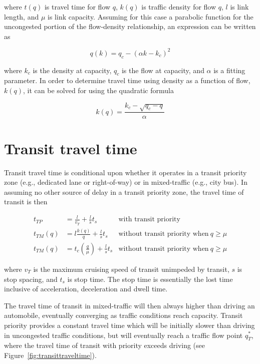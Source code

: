 \documentclass{article}
\begin{document}
\noindent where $t(q)$ is travel time for flow $q$, $k(q)$ is traffic density for flow $q$, $l$ is link length, and $\mu$ is link capacity. Assuming for this case a parabolic function for the uncongested portion of the flow-density relationship, an expression can be written as

\begin{equation}
    q(k) = q_c - (\alpha k - k_c)^2
\end{equation}

\noindent where $k_c$ is the density at capacity, $q_c$ is the flow at capacity, and $\alpha$ is a fitting parameter. In order to determine travel time using density as a function of flow, $k(q)$, it can be solved for using the quadratic formula

\begin{equation}
    k(q) = \frac{k_c - \sqrt{q_c - q}}{\alpha}
\end{equation}


\section{Transit travel time}

Transit travel time is conditional upon whether it operates in a transit priority zone (e.g., dedicated lane or right-of-way) or in mixed-traffic (e.g., city bus). In assuming no other source of delay in a transit priority zone, the travel time of transit is then

\begin{subequations}
\begin{align}
    t_{TP} & = \frac{l}{v_T} + \frac{l}{s}t_s  & \text{with transit priority} \\
    t_{TM}(q) & = l\frac{k(q)}{q} + \frac{l}{s}t_s  & \text{without transit priority when}~q \geq \mu\\
    t_{TM}(q) & = t_c \left(\frac{q}{\mu}\right) + \frac{l}{s}t_s & \text{without transit priority when}~q \geq \mu
\end{align}
\end{subequations}

\noindent where $v_T$ is the maximum cruising speed of transit unimpeded by transit, $s$ is stop spacing, and $t_s$ is stop time. The stop time is essentially the lost time inclusive of acceleration, deceleration and dwell time.

The travel time of transit in mixed-traffic will then always higher than driving an automobile, eventually converging as traffic conditions reach capacity. Transit priority provides a constant travel time which will be initially slower than driving in uncongested traffic conditions, but will eventually reach a traffic flow point $q^*_T$, where the travel time of transit with priority exceeds driving (see Figure~\ref{fig:transittraveltime}). 
\end{document}
